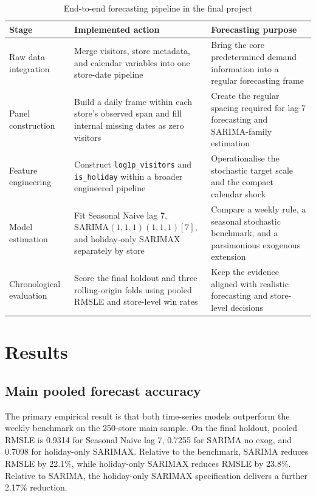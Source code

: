 \documentclass[11pt,oneside]{scrartcl}
\begin{document}
\begin{table}[H]
\centering
\caption{End-to-end forecasting pipeline in the final project}
\begin{tabularx}{\textwidth}{>{\raggedright\arraybackslash}p{} >{\raggedright\arraybackslash}p{} >{\raggedright\arraybackslash}X}
\toprule
Stage & Implemented action & Forecasting purpose \\
\midrule
Raw data integration & Merge visitors, store metadata, and calendar variables into one store-date pipeline & Bring the core predetermined demand information into a regular forecasting frame \\
Panel construction & Build a daily frame within each store's observed span and fill internal missing dates as zero visitors & Create the regular spacing required for lag-7 forecasting and SARIMA-family estimation \\
Feature engineering & Construct \texttt{log1p\_visitors} and \texttt{is\_holiday} within a broader engineered pipeline & Operationalise the stochastic target scale and the compact calendar shock \\
Model estimation & Fit Seasonal Naive lag 7, SARIMA$(1,1,1)(1,1,1)[7]$, and holiday-only SARIMAX separately by store & Compare a weekly rule, a seasonal stochastic benchmark, and a parsimonious exogenous extension \\
Chronological evaluation & Score the final holdout and three rolling-origin folds using pooled RMSLE and store-level win rates & Keep the evidence aligned with realistic forecasting and store-level decisions \\
\bottomrule
\end{tabularx}
\end{table}

\section{Results}
\subsection{Main pooled forecast accuracy}
The primary empirical result is that both time-series models outperform the weekly benchmark on the 250-store main sample. On the final holdout, pooled RMSLE is 0.9314 for Seasonal Naive lag 7, 0.7255 for SARIMA no exog, and 0.7098 for holiday-only SARIMAX. Relative to the benchmark, SARIMA reduces RMSLE by 22.1\%, while holiday-only SARIMAX reduces RMSLE by 23.8\%. Relative to SARIMA, the holiday-only SARIMAX specification delivers a further 2.17\% reduction.
\end{document}
